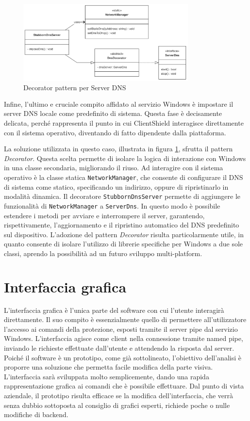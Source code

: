 \documentclass[12pt,a4paper,openright,twoside]{book}
\begin{document}
\begin{figure}[H]
	\centering
	\includegraphics[width=0.8\textwidth]{figures/dns-decorator-pattern.png}
	\caption{Decorator pattern per Server DNS}
	\label{fig:dns-decorator-pattern}
\end{figure}
Infine, l'ultimo e cruciale compito affidato al servizio Windows è impostare il server \gls{DNS} locale come predefinito di sistema.
Questa fase è decisamente delicata, perché rappresenta il punto in cui ClientShield interagisce direttamente con il sistema operativo, diventando di fatto dipendente dalla piattaforma.

La soluzione utilizzata in questo caso, illustrata in figura \ref{fig:dns-decorator-pattern}, sfrutta il pattern \textit{Decorator}.
Questa scelta permette di isolare la logica di interazione con Windows in una classe secondaria, migliorando il riuso.
Ad interagire con il sistema operativo è la classe statica \texttt{NetworkManager}, che consente di configurare il \gls{DNS} di sistema come statico, specificando un indirizzo, oppure di ripristinarlo in modalità dinamica.
Il decoratore \texttt{StubbornDnsServer} permette di aggiungere le funzionalità di \texttt{NetworkManager} a \texttt{ServerDns}.
In questo modo è possibile estendere i metodi per avviare e interrompere il server, garantendo, rispettivamente, l'aggiornamento e il ripristino automatico del \gls{DNS} predefinito sul dispositivo.
L'adozione del pattern \textit{Decorator} risulta particolarmente utile, in quanto consente di isolare l'utilizzo di librerie specifiche per Windows a due sole classi, aprendo la possibilità ad un futuro sviluppo multi-platform.

\section{Interfaccia grafica}

L'interfaccia grafica è l'unica parte del software con cui l'utente interagirà direttamente.
Il suo compito è essenzialmente quello di permettere all'utilizzatore l'accesso ai comandi della protezione, esposti tramite il server pipe dal servizio Windows.
L'interfaccia agisce come client nella connessione tramite named pipe, inviando le richieste effettuate dall'utente e attendendo la risposta dal server.
Poiché il software è un prototipo, come già sottolineato, l'obiettivo dell'analisi è proporre una soluzione che permetta facile modifica della parte visiva.
L'interfaccia sarà sviluppata molto semplicemente, dando una rapida rappresentazione grafica ai comandi che è possibile effettuare.
Dal punto di vista aziendale, il prototipo risulta efficace se la modifica dell'interfaccia, che verrà senza dubbio sottoposta al consiglio di grafici esperti, richiede poche o nulle modifiche di backend.
\end{document}
